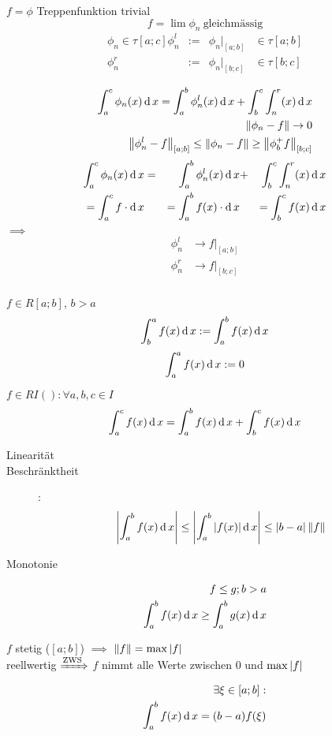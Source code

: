 \begin{Bew}
  $f=\phi$ Treppenfunktion trivial
  \[f=\lim\phi_n\ \text{gleichmässig}\]
  \begin{align*}
    \phi_n\in \tau[a;c]
    \phi_n^l &:=& \phi_n|_{[a;b]}&\in\tau[a;b]\\
    \phi_n^r &:=& \phi_n|_{[b;c]}&\in\tau[b;c]\\
  \end{align*}
  \begin{align*}
    \int^c_a\phi_n(x)\operatorname{d} x = \int^b_a\phi_n^l(x)\operatorname{d} x+\int^c_b \int^r_n(x)\operatorname{d} x\\
    \left\| \phi_n-f \right\|\to0\\
    \left\| \phi_n^l-f \right\|_{[a;b]}\leq \left\| \phi_n-f \right\|\geq \left\| \phi_b^+f \right\|_{[b;c]}
  \end{align*}
  \begin{align*}
    \int^c_a\phi_n(x)\operatorname{d} x &=& \int^b_a\phi_n^l(x)\operatorname{d} x&+&\int^c_b \int^r_n(x)\operatorname{d} x\\
    =\int^c_a f \cdot \operatorname{d} x & &=\int^b_a f(x) \cdot \operatorname{d} x & & =\int^c_b f(x) \operatorname{d} x
  \end{align*}
  $\implies$
  \begin{align*}
    \phi_n^l&\to f|_{[a;b]}\\
    \phi_n^r&\to f|_{[b;c]}\\
  \end{align*}
\end{Bew}
\begin{Def}
  $f\in R[a;b]$, $b>a$
  \[\int^a_bf(x)\operatorname{d} x := \int^b_af(x)\operatorname{d} x\]
  \[\int^a_af(x)\operatorname{d} x := 0 \]
\end{Def}
\begin{Sat}
  $f\in RI(): \forall a,b,c \in I$
  \[\int^c_af(x)\operatorname{d} x = \int^b_af(x)\operatorname{d} x + \int^c_bf(x)\operatorname{d} x\]
\end{Sat}
\begin{Bem}
  \begin{description}
    \item[Linearität]
    \item[Beschränktheit]: \[\left| \int^b_af(x)\operatorname{d} x \right|\leq \left| \int^b_a\left| f(x) \right|\operatorname{d} x \right|\leq \left| b-a \right|\left\| f \right\|\]
    \item[Monotonie]
  \end{description}
  \begin{align*}
    f\leq g; b>a\\
    \int^b_a f(x)\operatorname{d} x \geq \int^b_ag(x)\operatorname{d} x
  \end{align*}
\end{Bem}
\begin{Bem}
  $f$ stetig ($[a;b]$) $\implies$ $\left\| f \right\| = \max\left| f \right|$\\
  reellwertig $\xRightarrow{\text{ZWS}}$ $f$ nimmt alle Werte zwischen $0$ und $\max\left| f \right|$ %
  \begin{align*}
    \exists\xi\in [a;b]:\\
    \int^b_af(x)\operatorname{d} x=(b-a)f(\xi)
  \end{align*}
\end{Bem}
